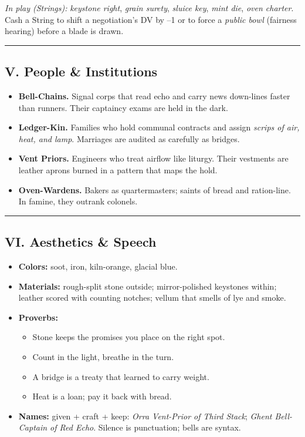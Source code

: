 \documentclass[11pt]{article}
\begin{document}
\textit{In play (Strings):} \emph{keystone right}, \emph{grain surety}, \emph{sluice key}, \emph{mint die}, \emph{oven charter}. Cash a String to shift a negotiation's DV by --1 or to force a \emph{public bowl} (fairness hearing) before a blade is drawn.

\medskip\hrule\medskip

\subsection{V. People \& Institutions}

\begin{itemize}[leftmargin=*]
  \item \textbf{Bell-Chains.} Signal corps that read echo and carry news down-lines faster than runners. Their captaincy exams are held in the dark.
  \item \textbf{Ledger-Kin.} Families who hold communal contracts and assign \emph{scrips of air, heat, and lamp}. Marriages are audited as carefully as bridges.
  \item \textbf{Vent Priors.} Engineers who treat airflow like liturgy. Their vestments are leather aprons burned in a pattern that maps the hold.
  \item \textbf{Oven-Wardens.} Bakers as quartermasters; saints of bread and ration-line. In famine, they outrank colonels.
\end{itemize}

\medskip\hrule\medskip

\subsection{VI. Aesthetics \& Speech}

\begin{itemize}[leftmargin=*]
  \item \textbf{Colors:} soot, iron, kiln-orange, glacial blue.
  \item \textbf{Materials:} rough-split stone outside; mirror-polished keystones within; leather scored with counting notches; vellum that smells of lye and smoke.
  \item \textbf{Proverbs:} 
  \begin{itemize}
    \item Stone keeps the promises you place on the right spot.
    \item Count in the light, breathe in the turn.
    \item A bridge is a treaty that learned to carry weight.
    \item Heat is a loan; pay it back with bread.
  \end{itemize}
  \item \textbf{Names:} given + craft + keep: \emph{Orra Vent-Prior of Third Stack}; \emph{Ghent Bell-Captain of Red Echo}. Silence is punctuation; bells are syntax.
\end{itemize}
\end{document}
